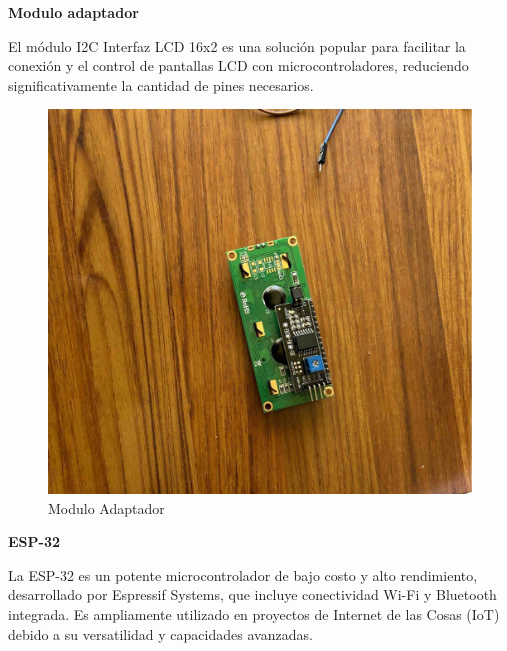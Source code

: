 \textbf{Modulo adaptador}

El módulo I2C Interfaz LCD 16x2 es una solución popular para facilitar la conexión y el control de pantallas LCD con microcontroladores, reduciendo significativamente la cantidad de pines necesarios.

\begin{figure}[H]
        \centering
        \includegraphics[trim = {30mm 30mm 30mm 30mm},clip,scale=0.2]{10/Img/moduloAdaptador.pdf}
        \caption{Modulo Adaptador}
        \label{Adaptador}
 \end{figure}

\textbf{ESP-32}

La ESP-32 es un potente microcontrolador de bajo costo y alto rendimiento, desarrollado por Espressif Systems, que incluye conectividad Wi-Fi y Bluetooth integrada. Es ampliamente utilizado en proyectos de Internet de las Cosas (IoT) debido a su versatilidad y capacidades avanzadas. 


